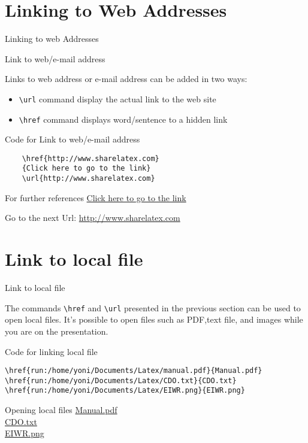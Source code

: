 \documentclass[10pt,xcolor=x11names]{beamer}
\begin{document}
\section{Linking to Web Addresses}
\begin{frame}[fragile]{Linking to web Addresses} 

\begin{exampleblock}{Link to web/e-mail address}
	
Links to web address or e-mail address can be added in two ways:
\begin{itemize}
		\item \verb|\url| command display the actual link to the web site 
		
		\item \verb|\href| command displays word/sentence to a hidden link  	
\end{itemize}
\end{exampleblock}

\begin{exampleblock}{Code for Link to web/e-mail address}
\begin{verbatim}
	\href{http://www.sharelatex.com}
	{Click here to go to the link}
	\url{http://www.sharelatex.com}
\end{verbatim}
\end{exampleblock}

For further references \href{http://www.sharelatex.com}    {\alert{Click here to go to the link}}

\vspace{5pt}

Go to the next Url:
\alert{\url{http://www.sharelatex.com}}
\end{frame}

\section{Link to local file}
\begin{frame}[fragile]{Link to local file} 

The commands \verb|\href|  and \verb|\url| presented in the previous section can be used to open local files. It's possible to open files such as PDF,text file, and images while you are on the presentation.

\begin{exampleblock}{Code for linking local file}
\begin{verbatim}
\href{run:/home/yoni/Documents/Latex/manual.pdf}{Manual.pdf}
\href{run:/home/yoni/Documents/Latex/CDO.txt}{CDO.txt} 
\href{run:/home/yoni/Documents/Latex/EIWR.png}{EIWR.png}
\end{verbatim}
\end{exampleblock}

\begin{exampleblock}{Opening local files}
 \href{run:/home/yoni/Documents/Latex/manual.pdf}{Manual.pdf}\\
\href{run:/home/yoni/Documents/Latex/CDO.txt}{CDO.txt} \\
\href{run:/home/yoni/Documents/Latex/EIWR.png}{EIWR.png} \\
\end{exampleblock}
\end{frame}
\end{document}
